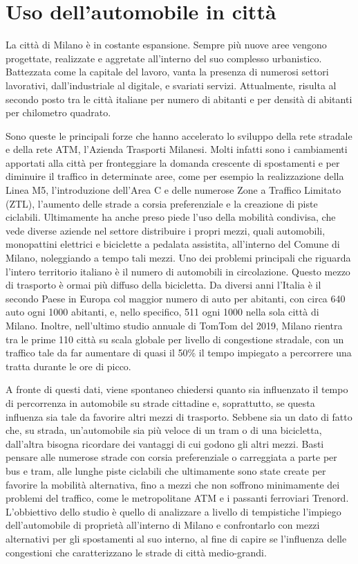 \section{Uso dell'automobile in città}

La città di Milano è in costante espansione. Sempre più nuove aree vengono progettate, realizzate e aggretate all'interno del suo complesso urbanistico. Battezzata come la capitale del lavoro, vanta la presenza di numerosi settori lavorativi, dall'industriale al digitale, e svariati servizi. Attualmente, risulta al secondo posto tra le città italiane per numero di abitanti e per densità di abitanti per chilometro quadrato.

Sono queste le principali forze che hanno accelerato lo sviluppo della rete stradale e della rete ATM, l'Azienda Trasporti Milanesi. Molti infatti sono i cambiamenti apportati alla città per fronteggiare la domanda crescente di spostamenti e per diminuire il traffico in determinate aree, come per esempio la realizzazione della Linea M5, l'introduzione dell'Area C e delle numerose Zone a Traffico Limitato (ZTL), l'aumento delle strade a corsia preferenziale e la creazione di piste ciclabili. Ultimamente ha anche preso piede l'uso della mobilità condivisa, che vede diverse aziende nel settore distribuire i propri mezzi, quali automobili, monopattini elettrici e biciclette a pedalata assistita, all'interno del Comune di Milano, noleggiando a tempo tali mezzi. Uno dei problemi principali che riguarda l'intero territorio italiano è il numero di automobili in circolazione. Questo mezzo di trasporto è ormai più diffuso della bicicletta. Da diversi anni l'Italia è il secondo Paese in Europa col maggior numero di auto per abitanti, con circa 640 auto ogni 1000 abitanti\cite{eurostatcars}, e, nello specifico, 511 ogni 1000 nella sola città di Milano. Inoltre, nell'ultimo studio annuale di TomTom del 2019\cite{tomtomindexmilan}, Milano rientra tra le prime 110 città su scala globale per livello di congestione stradale, con un traffico tale da far aumentare di quasi il 50\% il tempo impiegato a percorrere una tratta durante le ore di picco.

A fronte di questi dati, viene spontaneo chiedersi quanto sia influenzato il tempo di percorrenza in automobile su strade cittadine e, soprattutto, se questa influenza sia tale da favorire altri mezzi di trasporto. Sebbene sia un dato di fatto che, su strada, un'automobile sia più veloce di un tram o di una bicicletta, dall'altra bisogna ricordare dei vantaggi di cui godono gli altri mezzi. Basti pensare alle numerose strade con corsia preferenziale o carreggiata a parte per bus e tram, alle lunghe piste ciclabili che ultimamente sono state create per favorire la mobilità alternativa, fino a mezzi che non soffrono minimamente dei problemi del traffico, come le metropolitane ATM e i passanti ferroviari Trenord. L'obbiettivo dello studio è quello di analizzare a livello di tempistiche l'impiego dell'automobile di proprietà all'interno di Milano e confrontarlo con mezzi alternativi per gli spostamenti al suo interno, al fine di capire se l'influenza delle congestioni che caratterizzano le strade di città medio-grandi.

